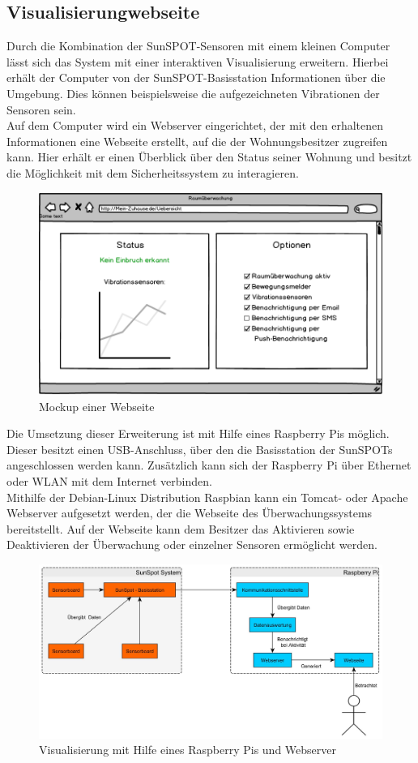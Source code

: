 \subsection{Visualisierungwebseite}\label{ss:visualisierung}



Durch die Kombination der SunSPOT-Sensoren mit einem kleinen Computer lässt sich das System mit einer interaktiven Visualisierung erweitern. Hierbei erhält der Computer von der SunSPOT-Basisstation Informationen über die Umgebung. Dies können beispielsweise die aufgezeichneten Vibrationen der Sensoren sein.\\
Auf dem Computer wird ein Webserver eingerichtet, der mit den erhaltenen Informationen eine Webseite erstellt, auf die der Wohnungsbesitzer zugreifen kann. Hier erhält er einen Überblick über den Status seiner Wohnung und besitzt die Möglichkeit mit dem Sicherheitssystem zu interagieren. 

\vspace{5 mm}
\begin{figure}[H] 
	\centering
	\includegraphics[scale=0.47]{Bilder/mockupwebsite}
	\caption{Mockup einer Webseite}
	\label{f:mockupwebsite}
\end{figure}

Die Umsetzung dieser Erweiterung ist mit Hilfe eines Raspberry Pis möglich. Dieser besitzt einen USB-Anschluss, über den die Basisstation der SunSPOTs angeschlossen werden kann. Zusätzlich kann sich der Raspberry Pi über Ethernet oder WLAN mit dem Internet verbinden.\\
Mithilfe der Debian-Linux Distribution Raspbian kann ein Tomcat- oder Apache Webserver aufgesetzt werden, der die Webseite des Überwachungssystems bereitstellt. Auf der Webseite kann dem Besitzer das Aktivieren sowie Deaktivieren der Überwachung oder einzelner Sensoren ermöglicht werden.

\begin{figure}[H] 
	\centering
	\includegraphics[scale=0.25]{Bilder/Visualisierung}
	\caption{Visualisierung mit Hilfe eines Raspberry Pis und Webserver}
	\label{f:visualisierung}
\end{figure}